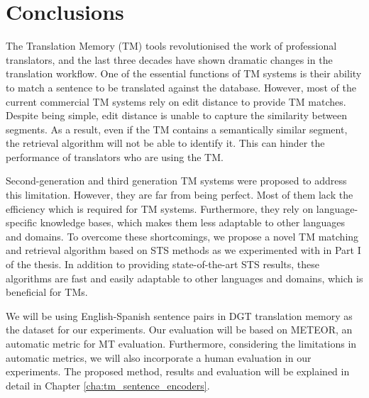 \section{Conclusions}
The Translation Memory (TM) tools revolutionised the work of professional translators, and the last three decades have shown dramatic changes in the translation workflow. One of the essential functions of TM systems is their ability to match a sentence to be translated against the database. However, most of the current commercial TM systems rely on edit distance to provide TM matches. Despite being simple, edit distance is unable to capture the similarity between segments. As a result, even if the TM contains a semantically similar segment, the retrieval algorithm will not be able to identify it. This can hinder the performance of translators who are using the TM. 

Second-generation and third generation TM systems were proposed to address this limitation. However, they are far from being perfect. Most of them lack the efficiency which is required for TM systems. Furthermore, they rely on language-specific knowledge bases, which makes them less adaptable to other languages and domains. To overcome these shortcomings, we propose a novel TM matching and retrieval algorithm based on STS methods as we experimented with in Part I of the thesis. In addition to providing state-of-the-art STS results, these algorithms are fast and easily adaptable to other languages and domains, which is beneficial for TMs. 

We will be using English-Spanish sentence pairs in DGT translation memory as the dataset for our experiments. Our evaluation will be based on METEOR, an automatic metric for MT evaluation. Furthermore, considering the limitations in automatic metrics, we will also incorporate a human evaluation in our experiments. The proposed method, results and evaluation will be explained in detail in Chapter \ref{cha:tm_sentence_encoders}.







